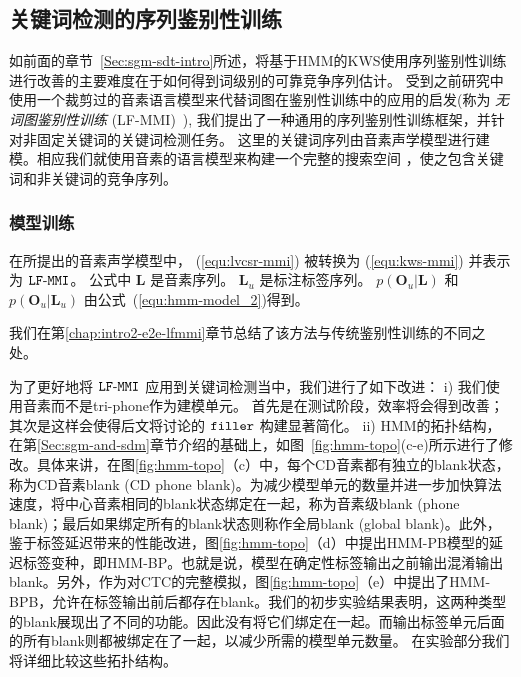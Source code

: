 \subsection{关键词检测的序列鉴别性训练}
\label{Sec:kws-disc-proposed}

如前面的章节~\ref{Sec:sgm-sdt-intro}所述，将基于HMM的KWS使用序列鉴别性训练进行改善的主要难度在于如何得到词级别的可靠竞争序列估计。
受到之前研究中使用一个裁剪过的音素语言模型来代替词图在鉴别性训练中的应用的启发(称为 {\em 无词图鉴别性训练} (LF-MMI)~\cite{povey2016purely,chen2006advances}), 我们提出了一种通用的序列鉴别性训练框架，并针对非固定关键词的关键词检测任务。
这里的关键词序列由音素声学模型进行建模。相应我们就使用音素的语言模型来构建一个完整的搜索空间 ，使之包含关键词和非关键词的竞争序列。

\subsubsection{模型训练}
\label{Sec:lfmmi-train}

在所提出的音素声学模型中， (\ref{equ:lvcsr-mmi}) 被转换为 (\ref{equ:kws-mmi}) 并表示为 $\tt{LF\text{-}MMI}$。
公式中 $\mathbf{L}$ 是音素序列。 $\mathbf{L}_u$ 是标注标签序列。
$p(\mathbf{O}_u|\mathbf{L})$ 和 $p(\mathbf{O}_u|\mathbf{L}_u)$ 由公式~(\ref{equ:hmm-model_2})得到。 


我们在第\ref{chap:intro2-e2e-lfmmi}章节总结了该方法与传统鉴别性训练的不同之处。



为了更好地将 $\tt{LF\text{-}MMI}$ 应用到关键词检测当中，我们进行了如下改进：
i) 我们使用音素而不是tri-phone作为建模单元。
首先是在测试阶段，效率将会得到改善；其次是这样会使得后文将讨论的 $\tt filler$ 构建显著简化。
ii) HMM的拓扑结构，在第\ref{Sec:sgm-and-sdm}章节介绍的基础上，如图~\ref{fig:hmm-topo}(c-e)所示进行了修改。具体来讲，在图\ref{fig:hmm-topo}（c）中，每个CD音素都有独立的blank状态，称为CD音素blank (CD phone blank)。为减少模型单元的数量并进一步加快算法速度，将中心音素相同的blank状态绑定在一起，称为音素级blank (phone blank)；最后如果绑定所有的blank状态则称作全局blank (global blank)。此外，鉴于标签延迟带来的性能改进\cite{amodei2015deep}，图\ref{fig:hmm-topo}（d）中提出HMM-PB模型的延迟标签变种，即HMM-BP。也就是说，模型在确定性标签输出之前输出混淆输出blank。另外，作为对CTC的完整模拟，图\ref{fig:hmm-topo}（e）中提出了HMM-BPB，允许在标签输出前后都存在blank。我们的初步实验结果表明，这两种类型的blank展现出了不同的功能。因此没有将它们绑定在一起。而输出标签单元后面的所有blank则都被绑定在了一起，以减少所需的模型单元数量。
在实验部分我们将详细比较这些拓扑结构。

